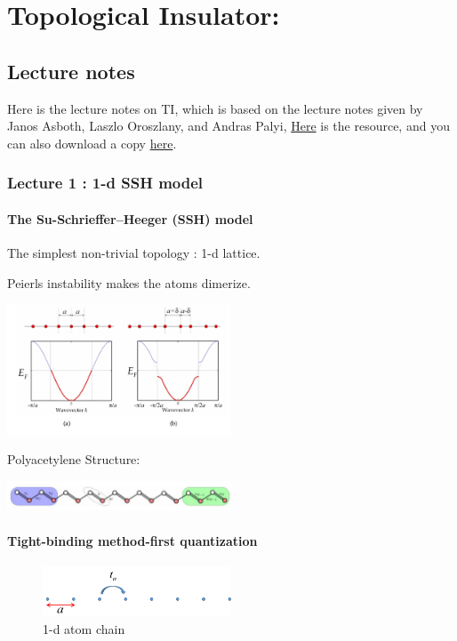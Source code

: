 \documentclass[letterpaper,10pt,english]{sphinxmanual}
\begin{document}
\chapter{Topological Insulator:}
\label{index:topological-insulator}

\section{Lecture notes}
\label{TI/Lecture notes/main:lecture-notes}\label{TI/Lecture notes/main::doc}\label{TI/Lecture notes/main:id1}
Here is the lecture notes on TI, which is based on the lecture notes given by Janos Asboth, Laszlo Oroszlany, and Andras Palyi, \href{http://fizipedia.bme.hu/images/1/14/Topological\_insulators.pdf}{Here} is the resource, and you can also download a copy \href{https://github.com/bczhu/phyx/raw/master/\_static/files/TI.pdf}{here}.


\subsection{Lecture 1 : 1-d SSH model}
\label{TI/Lecture notes/1::doc}\label{TI/Lecture notes/1:lecture-1-1-d-ssh-model}

\subsubsection{The Su-Schrieffer--Heeger (SSH) model}
\label{TI/Lecture notes/1:the-su-schrieffer-heeger-ssh-model}
The simplest non-trivial topology : 1-d lattice.

Peierls instability makes the atoms dimerize.

\includegraphics[width=0.5\textwidth]{11.png}

Polyacetylene Structure: 

\includegraphics[width=0.5\textwidth]{2.jpg}


\subsubsection{Tight-binding method-first quantization}
\label{TI/Lecture notes/1:tight-binding-method-first-quantization}\begin{figure}[htbp]
\centering
\capstart

\includegraphics[width=0.5\textwidth]{31.png}
\caption{1-d atom chain}\end{figure}
\end{document}
